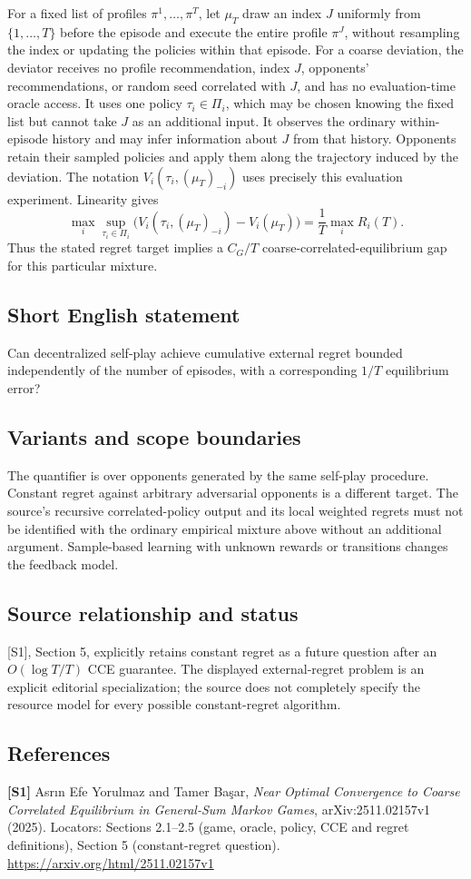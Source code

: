 \documentclass[11pt,a4paper]{article}
\begin{document}
For a fixed list of profiles $\pi^1,\ldots,\pi^T$, let $\mu_T$ draw an index $J$ uniformly from $\{1,\ldots,T\}$ before the episode and execute the entire profile $\pi^J$, without resampling the index or updating the policies within that episode. For a coarse deviation, the deviator receives no profile recommendation, index $J$, opponents' recommendations, or random seed correlated with $J$, and has no evaluation-time oracle access. It uses one policy $\tau_i\in\Pi_i$, which may be chosen knowing the fixed list but cannot take $J$ as an additional input. It observes the ordinary within-episode history and may infer information about $J$ from that history. Opponents retain their sampled policies and apply them along the trajectory induced by the deviation. The notation $V_i(\tau_i,(\mu_T)_{-i})$ uses precisely this evaluation experiment. Linearity gives
\[
 \max_i\sup_{\tau_i\in\Pi_i}
 \bigl(V_i(\tau_i,(\mu_T)_{-i})-V_i(\mu_T)\bigr)
 =\frac1T\max_i R_i(T).
\]
Thus the stated regret target implies a $C_G/T$ coarse-correlated-equilibrium gap for this particular mixture.
\subsection*{Short English statement}
Can decentralized self-play achieve cumulative external regret bounded independently of the number of episodes, with a corresponding $1/T$ equilibrium error?
\subsection*{Variants and scope boundaries}
The quantifier is over opponents generated by the same self-play procedure. Constant regret against arbitrary adversarial opponents is a different target. The source's recursive correlated-policy output and its local weighted regrets must not be identified with the ordinary empirical mixture above without an additional argument. Sample-based learning with unknown rewards or transitions changes the feedback model.
\subsection*{Source relationship and status}
[S1], Section 5, explicitly retains constant regret as a future question after an $O(\log T/T)$ CCE guarantee. The displayed external-regret problem is an explicit editorial specialization; the source does not completely specify the resource model for every possible constant-regret algorithm.
\subsection*{References}
\begingroup\footnotesize\raggedright
\textbf{[S1]} Asr\i n Efe Yorulmaz and Tamer Ba\c{s}ar, \emph{Near Optimal Convergence to Coarse Correlated Equilibrium in General-Sum Markov Games}, arXiv:2511.02157v1 (2025). Locators: Sections 2.1--2.5 (game, oracle, policy, CCE and regret definitions), Section 5 (constant-regret question). \url{https://arxiv.org/html/2511.02157v1}
\par\endgroup
\end{document}
